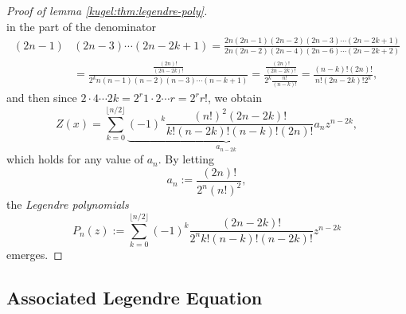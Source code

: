 \begin{proof}[Proof of lemma \ref{kugel:thm:legendre-poly}]
\begin{equation*}
  \end{equation*}
  in the part of the denominator
  \begin{align*}
    (2n-1) & (2n-3) \cdots (2n-2k+1) = \frac{
        2n(2n-1)(2n-2)(2n-3) \cdots (2n-2k+1)
      }{
        2n(2n-2)(2n-4)(2n-6) \cdots (2n-2k+2)
      }
      \\
      &= \frac{
        \frac{(2n)!}{(2n-2k)!}
      }{
        2^k n(n-1)(n-2)(n-3) \cdots (n-k+1)
      }
      = \frac{
        \frac{(2n)!}{(2n-2k)!}
      }{
        2^k \frac{n!}{(n-k)!}
      }
      = \frac{(n-k)!(2n)!}{n!(2n-2k)!2^k},
  \end{align*}
  and then since $2 \cdot 4 \cdots 2k = 2^r 1\cdot2 \cdots r = 2^r r!$, we
  obtain
  \begin{equation*}
    Z(x) = \sum_{k=0}^{\lfloor n / 2\rfloor}
      \underbrace{
        (-1)^k \frac{(n!)^2(2n-2k)!}{k!(n-2k)!(n-k)!(2n)!} a_n
      }_{a_{n-2k}} z^{n-2k},
  \end{equation*}
  which holds for any value of $a_n$. By letting
  \begin{equation*}
    a_{n} := \frac{(2n)!}{2^n (n!)^2},
  \end{equation*}
  the \emph{Legendre polynomials}
  \begin{equation}
    P_n(z) := \sum_{k=0}^{\lfloor n/2 \rfloor}
      (-1)^k \frac{(2n-2k)!}{2^n k! (n-k)!(n-2k)!} z^{n-2k} 
  \end{equation}
  emerges.
\end{proof}

\subsection{Associated Legendre Equation}
\label{kugel:sec:proofs:associated-legendre}

